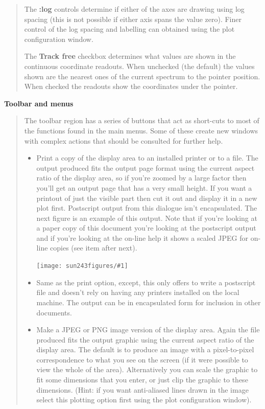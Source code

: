\documentclass[twoside,11pt]{article}
\newcommand{\htmladdimg}[1]{}
\newcommand{\latexhtml}[2]{#1}
\renewcommand{\_}{\texttt{\symbol{95}}}
\newcommand{\clippedmainfigure}[1]
{\begin{center}
 \latexhtml{\texttt{[image: sun243\_figures/\#1]}}{\htmladdimg{#1.gif}}
 \end{center}
}
\newcommand{\inline}[1]
        {\latexhtml{\texttt{[image: sun243\_figures/\#1]}}
        {\htmladdimg[align=center]{#1.gif}}}
\newcommand{\labelitem}[1]{\textbf{#1}}
\newcommand{\subheading}[1]{\textbf{\large{#1}}}
\begin{document}
\begin{quote}
 The \labelitem{:log} controls determine if either of the axes are drawing
 using log spacing (this is not possible if either axis spans the value
 zero). Finer control of the log spacing and labelling can obtained using the
 plot configuration window.

 The \labelitem{Track free} checkbox determines what values are shown in the
 continuous coordinate readouts. When unchecked (the default) the values
 shown are the nearest ones of the current spectrum to the pointer position.
 When checked the readouts show the coordinates under the pointer.

\end{quote}

\subheading{Toolbar and menus}
\begin{quote}
 The toolbar region has a series of buttons that act as short-cuts to
 most of the functions found in the main menus. Some of these create
 new windows with complex actions that should be consulted for further
 help.

 \begin{itemize}

  \item[\inline{print}] Print a copy of the display area to an installed
  printer or to a file. The output produced fits the output page format using
  the current aspect ratio of the display area, so if you're zoomed by a large
  factor then you'll get an output page that has a very small height. If you
  want a printout of just the visible part then cut it out and display it in a
  new plot first. Postscript output from this dialogue isn't encapsulated.
  The next figure is an example of this output. Note that if you're looking at
  a paper copy of this document you're looking at the postscript output and if
  you're looking at the on-line help it shows a scaled JPEG for on-line copies
  (see item after next).

  \clippedmainfigure{printoutput}

  \item[\inline{postscriptprint}] Same as the print option, except, this only
  offers to write a postscript file and doesn't rely on having any printers
  installed on the local machine. The output can be in encapsulated form
  for inclusion in other documents.

  \item[\inline{jpegpng}] Make a JPEG or PNG image version of the display
  area. Again the file produced fits the output graphic using the current
  aspect ratio of the display area. The default is to produce an image
  with a pixel-to-pixel correspondence to what you see on the screen
  (if it were possible to view the whole of the area). Alternatively you
  can scale the graphic to fit some dimensions that you enter, or just
  clip the graphic to these dimensions. (Hint: if you want anti-aliased
  lines drawn in the image select this plotting option first using the plot
  configuration window).


\end{itemize}
\end{quote}
\end{document}

